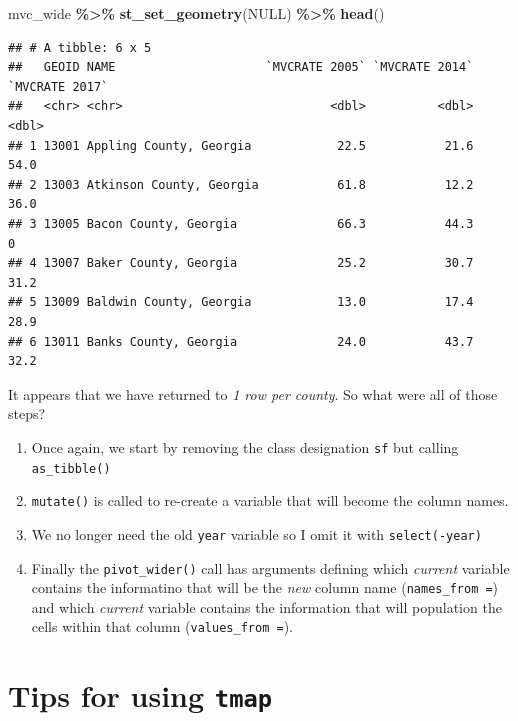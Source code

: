 \documentclass[
]{book}
\newenvironment{Shaded}{\begin{snugshade}}{\end{snugshade}}
\newcommand{\ConstantTok}[1]{\textcolor[rgb]{0.56,0.35,0.01}{#1}}
\newcommand{\FunctionTok}[1]{\textcolor[rgb]{0.13,0.29,0.53}{\textbf{#1}}}
\newcommand{\NormalTok}[1]{#1}
\newcommand{\SpecialCharTok}[1]{\textcolor[rgb]{0.81,0.36,0.00}{\textbf{#1}}}
\providecommand{\tightlist}{%
  \setlength{\itemsep}{0pt}\setlength{\parskip}{0pt}}
\begin{document}
\begin{Shaded}
\begin{Highlighting}[]
\NormalTok{mvc\_wide }\SpecialCharTok{\%\textgreater{}\%}
  \FunctionTok{st\_set\_geometry}\NormalTok{(}\ConstantTok{NULL}\NormalTok{) }\SpecialCharTok{\%\textgreater{}\%}
  \FunctionTok{head}\NormalTok{()}
\end{Highlighting}
\end{Shaded}

\begin{verbatim}
## # A tibble: 6 x 5
##   GEOID NAME                     `MVCRATE 2005` `MVCRATE 2014` `MVCRATE 2017`
##   <chr> <chr>                             <dbl>          <dbl>          <dbl>
## 1 13001 Appling County, Georgia            22.5           21.6           54.0
## 2 13003 Atkinson County, Georgia           61.8           12.2           36.0
## 3 13005 Bacon County, Georgia              66.3           44.3            0  
## 4 13007 Baker County, Georgia              25.2           30.7           31.2
## 5 13009 Baldwin County, Georgia            13.0           17.4           28.9
## 6 13011 Banks County, Georgia              24.0           43.7           32.2
\end{verbatim}

It appears that we have returned to \emph{1 row per county}. So what were all of those steps?

\begin{enumerate}
\def\labelenumi{\arabic{enumi}.}
\tightlist
\item
  Once again, we start by removing the class designation \texttt{sf} but calling \texttt{as\_tibble()}
\item
  \texttt{mutate()} is called to re-create a variable that will become the column names.
\item
  We no longer need the old \texttt{year} variable so I omit it with \texttt{select(-year)}
\item
  Finally the \texttt{pivot\_wider()} call has arguments defining which \emph{current} variable contains the informatino that will be the \emph{new} column name (\texttt{names\_from\ =}) and which \emph{current} variable contains the information that will population the cells within that column (\texttt{values\_from\ =}).
\end{enumerate}

\hypertarget{intro-tmap}{%
\chapter{\texorpdfstring{Tips for using \texttt{tmap}}{Tips for using tmap}}\label{intro-tmap}}
\end{document}
